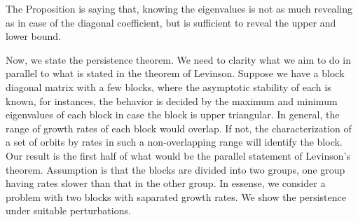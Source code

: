 \documentclass[a4paper,11pt]{article}
\newcommand{\udl}{\underline{\lambda}}
\theoremstyle{remark}
\begin{document}
%  

The Proposition is saying that, knowing the eigenvalues is not as much revealing as in case of the diagonal coefficient, but is sufficient to reveal the upper and lower bound. 


Now, we state the persistence theorem. We need to clarity what we aim to do in parallel to what is stated in the theorem of Levinson. Suppose we have a block diagonal matrix with a few   blocks, where the asymptotic stability of each is known, for instances, the behavior is decided by the maximum and minimum eigenvalues of each block in case the block is upper triangular. In general, the range of growth rates of each block would overlap. If not, the  characterization of a set of orbits by rates in such a non-overlapping range will identify the block. Our result is the first half of what would be the parallel statement of Levinson's theorem. Assumption is that the blocks are divided into two groups, one group having rates slower than that in the other group. In essense, we consider a problem with two blocks with saparated growth rates. We show the persistence under suitable perturbations.
\end{document}
